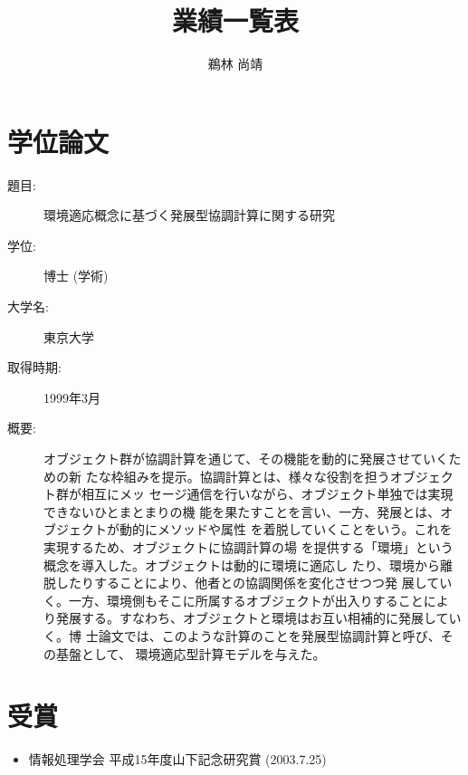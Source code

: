 \documentclass{jarticle}
\begin{document}
\title{業績一覧表}
\author{鵜林 尚靖}
\maketitle


\section{学位論文}
\begin{description}
\item [題目:] 環境適応概念に基づく発展型協調計算に関する研究
\item [学位:] 博士 (学術)
\item [大学名:] 東京大学
\item [取得時期:] 1999年3月
\item [概要:]

オブジェクト群が協調計算を通じて、その機能を動的に発展させていくための新
たな枠組みを提示。協調計算とは、様々な役割を担うオブジェクト群が相互にメッ
セージ通信を行いながら、オブジェクト単独では実現できないひとまとまりの機
能を果たすことを言い、一方、発展とは、オブジェクトが動的にメソッドや属性
を着脱していくことをいう。これを実現するため、オブジェクトに協調計算の場
を提供する「環境」という概念を導入した。オブジェクトは動的に環境に適応し
たり、環境から離脱したりすることにより、他者との協調関係を変化させつつ発
展していく。一方、環境側もそこに所属するオブジェクトが出入りすることによ
り発展する。すなわち、オブジェクトと環境はお互い相補的に発展していく。博
士論文では、このような計算のことを発展型協調計算と呼び、その基盤として、
環境適応型計算モデルを与えた。
\end{description}


\section{受賞}
\begin{itemize}
\item 情報処理学会 平成15年度山下記念研究賞 (2003.7.25)
\end{itemize}


\newpage
\end{document}

